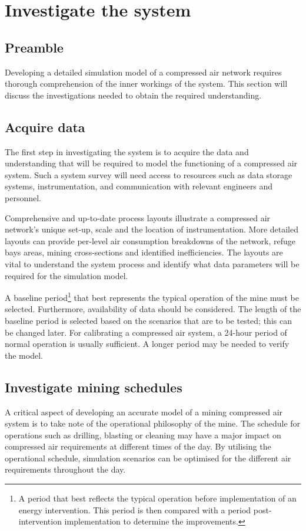 \section{Investigate the system}
	\subsection{Preamble}
		Developing a detailed simulation model of a compressed air network requires thorough comprehension of the inner workings of the system. This section will discuss the investigations needed to obtain the required understanding.
	\subsection{Acquire data} %
	The first step in investigating the system is to acquire the data and understanding that will be required to model the functioning of a compressed air system. Such a system survey will need access to resources such as data storage systems, instrumentation, and communication with relevant engineers and personnel.
	\par 
	Comprehensive and up-to-date process layouts illustrate a compressed air network's unique set-up, scale and the location of instrumentation. More detailed layouts can provide per-level air consumption breakdowns of the network, refuge bays areas, mining cross-sections and identified inefficiencies. The layouts are vital to understand the system process and identify what data parameters will be required for the simulation model. 
	\par 
	A baseline period\footnote{A period that best reflects the typical operation before implementation of an energy intervention. This period is then compared with a period post-intervention implementation to determine the improvements.} that best represents the typical operation of the mine must be selected. Furthermore, availability of data should be considered. The length of the baseline period is selected based on the scenarios that are to be tested; this can be changed later. For calibrating a compressed air system, a 24-hour period of normal operation is usually sufficient. A longer period may be needed to verify the model. 

	\subsection{Investigate mining schedules}
	A critical aspect of developing an accurate model of a mining compressed air system is to take note of the operational philosophy of the mine. The schedule for operations such as drilling, blasting or cleaning may have a major impact on compressed air requirements at different times of the day. By utilising the operational schedule, simulation scenarios can be optimised for the different air requirements throughout the day.	
	

